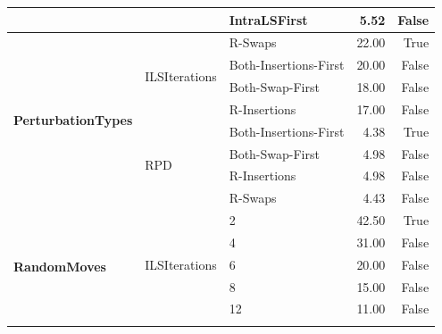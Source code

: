 \begin{table}[!ht]
\begin{tabular}{l|l|l|r|r}
		                                            &                                & IntraLSFirst          & 5.52            & False           \\\hline
		\multirow{8}{*}{\textbf{PerturbationTypes}} & \multirow{4}{*}{ILSIterations} & R-Swaps               & 22.00           & True            \\\cline{3-5}
		                                            &                                & Both-Insertions-First & 20.00           & False           \\\cline{3-5}
		                                            &                                & Both-Swap-First       & 18.00           & False           \\\cline{3-5}
		                                            &                                & R-Insertions          & 17.00           & False           \\\cline{2-5}
		                                            & \multirow{4}{*}{RPD}           & Both-Insertions-First & 4.38            & True            \\\cline{3-5}
		                                            &                                & Both-Swap-First       & 4.98            & False           \\\cline{3-5}
		                                            &                                & R-Insertions          & 4.98            & False           \\\cline{3-5}
		                                            &                                & R-Swaps               & 4.43            & False           \\\hline
		\multirow{10}{*}{\textbf{RandomMoves}}      & \multirow{5}{*}{ILSIterations} & 2                     & 42.50           & True            \\\cline{3-5}
		                                            &                                & 4                     & 31.00           & False           \\\cline{3-5}
		                                            &                                & 6                     & 20.00           & False           \\\cline{3-5}
		                                            &                                & 8                     & 15.00           & False           \\\cline{3-5}
		                                            &                                & 12                    & 11.00           & False           \\\cline{2-5}

\end{tabular}
\end{table}
